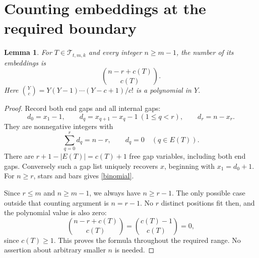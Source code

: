 \documentclass[11pt]{article}
\newtheorem{lemma}{Lemma}
\theoremstyle{definition}
\newcommand{\T}{\mathcal T}
\begin{document}
\section{Counting embeddings at the required boundary}
\begin{lemma}\label{gaps}
For $T\in\T_{t,m,k}$ and every integer $n\ge m-1$, the number of its embeddings is
\begin{equation}\label{binomial}
 \binom{n-r+c(T)}{c(T)}.
\end{equation}
Here $\binom{Y}{c}=Y(Y-1)\cdots(Y-c+1)/c!$ is a polynomial in $Y$.
\end{lemma}
\begin{proof}
Record both end gaps and all internal gaps:
\[
 d_0=x_1-1,\qquad d_q=x_{q+1}-x_q-1\ (1\le q<r),\qquad d_r=n-x_r.
\]
They are nonnegative integers with
\[
 \sum_{q=0}^r d_q=n-r,\qquad d_q=0\quad(q\in E(T)).
\]
There are $r+1-|E(T)|=c(T)+1$ free gap variables, including both end gaps. Conversely such a gap list uniquely recovers $x$, beginning with $x_1=d_0+1$. For $n\ge r$, stars and bars gives \eqref{binomial}.

Since $r\le m$ and $n\ge m-1$, we always have $n\ge r-1$. The only possible case outside that counting argument is $n=r-1$. No $r$ distinct positions fit then, and the polynomial value is also zero:
\[
 \binom{n-r+c(T)}{c(T)}=\binom{c(T)-1}{c(T)}=0,
\]
since $c(T)\ge1$. This proves the formula throughout the required range. No assertion about arbitrary smaller $n$ is needed.
\end{proof}
\end{document}
